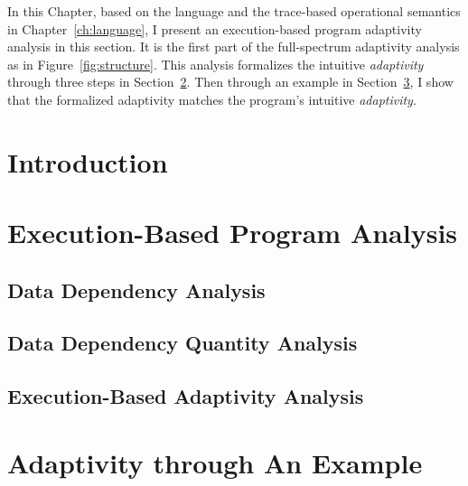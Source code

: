 In this Chapter, based on the language and the trace-based operational semantics in Chapter~\ref{ch:language},
I present an execution-based program adaptivity analysis in this section.
It is the first part of the full-spectrum adaptivity analysis as in Figure~\ref{fig:structure}. 
This analysis formalizes the intuitive \emph{adaptivity} through three steps in 
Section~\ref{sec:dynamic-analysis}.
Then through an example in Section~\ref{sec:dynamic-examples}, I show that the formalized
adaptivity matches the program's intuitive \emph{adaptivity}.
\section{Introduction}
\label{sec:dynamic-intro}
% 


\section{Execution-Based Program Analysis}
\label{sec:dynamic-analysis}

\subsection{Data Dependency Analysis}
\label{subsec:dynamic-datadep}


\subsection{Data Dependency Quantity Analysis}
\label{subsec:dynamic-reachability}
%

\subsection{Execution-Based Adaptivity Analysis}
\label{subsec:dynamic-adapt}
%
%
\section{Adaptivity through An Example}
\label{sec:dynamic-examples}


%
